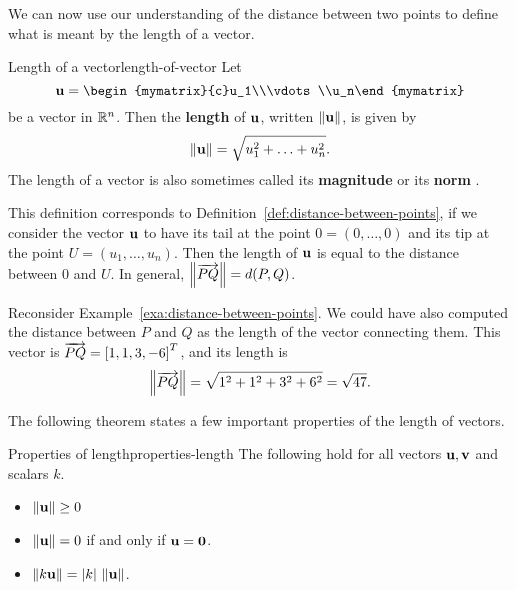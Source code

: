 We can now use our understanding of the distance between two points to
define what is meant by the length of a vector.

\begin{definition}{Length of a vector}{length-of-vector}
  Let
  \begin{equation*}
    \vect{u} = \begin{mymatrix}{c}u_1\\\vdots\\u_n\end{mymatrix}
  \end{equation*}
  be a vector in $\mathbb{R}^n$. Then the \textbf{length}%
   of $\vect{u}$, written $\norm{\vect{u}}$,
  is given by
  \begin{equation*}
    \norm{\vect{u}} = \sqrt{u_1^2 + \ldots + u_n^2}.
  \end{equation*}
  The length of a vector is also sometimes called its
  \textbf{magnitude}%
   or its
  \textbf{norm}%
  .
\end{definition}

This definition corresponds to
Definition~\ref{def:distance-between-points}, if we consider the
vector $\vect{u}$ to have its tail at the point
$0 = (0,\ldots,0)$ and its tip at the point
$U = (u_1,\ldots, u_n)$.  Then the length of $\vect{u}$ is equal
to the distance between $0$ and $U$. In general,
$\left\|\overrightarrow{PQ}\right\| = d(P,Q)$.

Reconsider Example~\ref{exa:distance-between-points}. We could have also
computed the distance between $P$ and $Q$ as the length of the vector
connecting them. This vector is $\overrightarrow{PQ} = \left[1,1,3,-6\right]^T$,
and its length is
\begin{equation*}
  \left\|\overrightarrow{PQ}\right\| = \sqrt{1^2+1^2+3^2+6^2} = \sqrt{47}.
\end{equation*}

The following theorem states a few important properties of the length
of vectors.

\begin{theorem}{Properties of length}{properties-length}
  The following hold for all vectors $\vect{u},\vect{v}$ and scalars $k$.
  \begin{itemize}
  \item $\norm{\vect{u}}\geq 0$
  \item $\norm{\vect{u}}=0$ if and only if $\vect{u}=\vect{0}$.
  \item $\norm{k\vect{u}} = |k|\,\norm{\vect{u}}$.
  \end{itemize}
\end{theorem}

